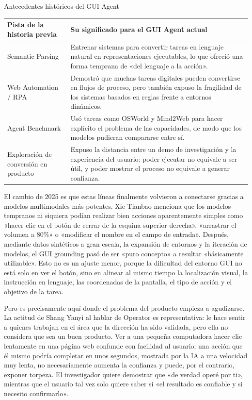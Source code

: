 \documentclass[a4paper]{article}
\begin{document}
\begin{knowledgebox}{Antecedentes históricos del GUI Agent}
\begin{tabularx}{\textwidth}{>{\raggedright\arraybackslash}p{} Y}
\toprule
Pista de la historia previa & Su significado para el GUI Agent actual \\
\midrule
Semantic Parsing & Entrenar sistemas para convertir tareas en lenguaje natural en representaciones ejecutables, lo que ofreció una forma temprana de «del lenguaje a la acción». \\
Web Automation / RPA & Demostró que muchas tareas digitales pueden convertirse en flujos de proceso, pero también expuso la fragilidad de los sistemas basados en reglas frente a entornos dinámicos. \\
Agent Benchmark & Usó tareas como OSWorld y Mind2Web para hacer explícito el problema de las capacidades, de modo que los modelos pudieran compararse entre sí. \\
Exploración de conversión en producto & Expuso la distancia entre un demo de investigación y la experiencia del usuario: poder ejecutar no equivale a ser útil, y poder mostrar el proceso no equivale a generar confianza. \\
\bottomrule
\end{tabularx}
\end{knowledgebox}

El cambio de 2025 es que estas líneas finalmente volvieron a conectarse gracias a modelos multimodales más potentes. Xie Tianbao menciona que los modelos tempranos ni siquiera podían realizar bien acciones aparentemente simples como «hacer clic en el botón de cerrar de la esquina superior derecha», «arrastrar el volumen a 80\%» o «modificar el nombre en el campo de entrada». Después, mediante datos sintéticos a gran escala, la expansión de entornos y la iteración de modelos, el GUI grounding pasó de ser «puro concepto» a resultar «básicamente utilizable». Esto no es un ajuste menor, porque la dificultad del entorno GUI no está solo en ver el botón, sino en alinear al mismo tiempo la localización visual, la instrucción en lenguaje, las coordenadas de la pantalla, el tipo de acción y el objetivo de la tarea.

Pero es precisamente aquí donde el problema del producto empieza a agudizarse. La actitud de Shang Yanyi al hablar de Operator es representativa: le hace sentir a quienes trabajan en el área que la dirección ha sido validada, pero ella no considera que sea un buen producto. Ver a una pequeña computadora hacer clic lentamente en una página web confunde con facilidad al usuario; una acción que él mismo podría completar en unos segundos, mostrada por la IA a una velocidad muy lenta, no necesariamente aumenta la confianza y puede, por el contrario, exponer torpeza. El investigador quiere demostrar que «de verdad operé por ti», mientras que el usuario tal vez solo quiere saber si «el resultado es confiable y si necesito confirmarlo».
\end{document}
